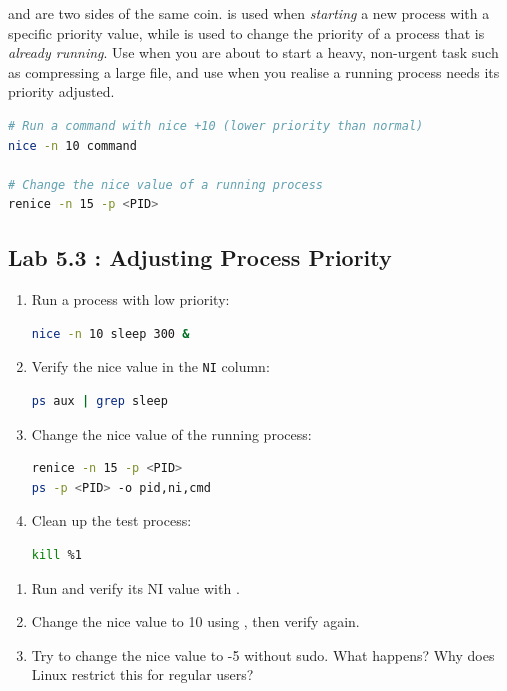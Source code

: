  and  are two sides of the same coin.  is used
when \textit{starting} a new process with a specific priority value, while
 is used to change the priority of a process that is \textit{already
running}. Use  when you are about to start a heavy, non-urgent task
such as compressing a large file, and use  when you realise a
running process needs its priority adjusted.

\begin{lstlisting}[language=bash, caption={Syntax of nice and renice}]
# Run a command with nice +10 (lower priority than normal)
nice -n 10 command

# Change the nice value of a running process
renice -n 15 -p <PID>
\end{lstlisting}

\subsection*{Lab 5.3 : Adjusting Process Priority}

\begin{enumerate}
  \item Run a process with low priority:
\begin{lstlisting}[language=bash, caption={Running a process with nice +10}]
nice -n 10 sleep 300 &
\end{lstlisting}

  \item Verify the nice value in the \texttt{NI} column:
\begin{lstlisting}[language=bash, caption={Viewing the nice value}]
ps aux | grep sleep
\end{lstlisting}

  \item Change the nice value of the running process:
\begin{lstlisting}[language=bash, caption={Changing nice with renice}]
renice -n 15 -p <PID>
ps -p <PID> -o pid,ni,cmd
\end{lstlisting}

  \item Clean up the test process:
\begin{lstlisting}[language=bash, caption={Stopping the test process}]
kill %1
\end{lstlisting}
\end{enumerate}

\begin{exercisebox}[5.3]
  \begin{enumerate}
    \item Run  and verify its NI value with
      .
    \item Change the nice value to 10 using , then verify again.
    \item Try to change the nice value to -5 without sudo. What happens? Why
      does Linux restrict this for regular users?
  \end{enumerate}
\end{exercisebox}

